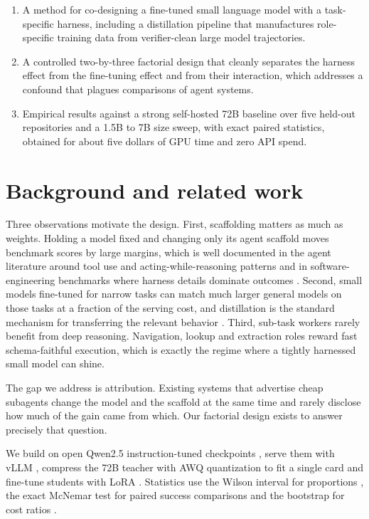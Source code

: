 \documentclass[11pt]{article}
\begin{document}
\begin{enumerate}
  \item A method for co-designing a fine-tuned small language model with a
        task-specific harness, including a distillation pipeline that
        manufactures role-specific training data from verifier-clean large
        model trajectories.
  \item A controlled two-by-three factorial design that cleanly separates the
        harness effect from the fine-tuning effect and from their interaction,
        which addresses a confound that plagues comparisons of agent systems.
  \item Empirical results against a strong self-hosted 72B baseline over five
        held-out repositories and a 1.5B to 7B size sweep, with exact paired
        statistics, obtained for about five dollars of GPU time and zero API
        spend.
\end{enumerate}

\section{Background and related work}

Three observations motivate the design. First, scaffolding matters as much as
weights. Holding a model fixed and changing only its agent scaffold moves
benchmark scores by large margins, which is well documented in the agent
literature around tool use and acting-while-reasoning patterns
\citep{yao2023react} and in software-engineering benchmarks where harness
details dominate outcomes \citep{jimenez2024swebench}. Second, small models
fine-tuned for narrow tasks can match much larger general models on those
tasks at a fraction of the serving cost, and distillation is the standard
mechanism for transferring the relevant behavior
\citep{hinton2015distill, hsieh2023step}. Third, sub-task workers rarely
benefit from deep reasoning. Navigation, lookup and extraction roles reward
fast schema-faithful execution, which is exactly the regime where a tightly
harnessed small model can shine.

The gap we address is attribution. Existing systems that advertise cheap
subagents change the model and the scaffold at the same time and rarely
disclose how much of the gain came from which. Our factorial design exists to
answer precisely that question.

We build on open Qwen2.5 instruction-tuned checkpoints \citep{qwen25}, serve
them with vLLM \citep{kwon2023vllm}, compress the 72B teacher with AWQ
quantization to fit a single card \citep{lin2024awq} and fine-tune students
with LoRA \citep{hu2022lora}. Statistics use the Wilson interval for
proportions \citep{wilson1927}, the exact McNemar test for paired success
comparisons \citep{mcnemar1947} and the bootstrap for cost ratios
\citep{efron1979}.
\end{document}
